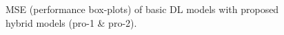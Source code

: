 \documentclass[a4paper, fleqn]{cas-sc}
\begin{document}
\begin{figure}[h!]
    \caption{MSE (performance box-plots) of basic DL models with proposed hybrid models (pro-1 \& pro-2).}
    \label{Fig:15}
  \end{figure}
\end{document}
